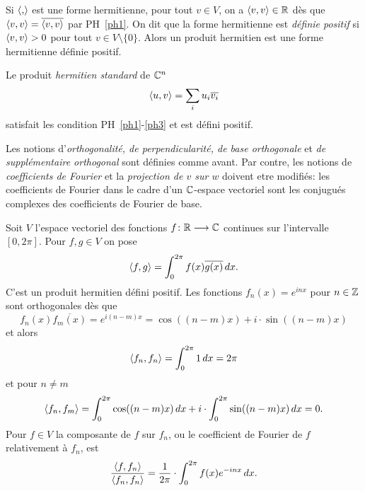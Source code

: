 \begin{remark}
Si $\langle {,} \rangle $  est une forme hermitienne, 
pour tout $v \in V$, on a $\langle {v,v} \rangle \in \mathbb{R}$ dès que $\langle {v,v} \rangle = \overline{\langle {v,v} \rangle}$ par PH~\ref{ph1}.  On dit que la forme hermitienne   est \emph{définie positif} si $\langle {v,v} \rangle >0$ pour tout $v \in V \setminus\{0\}$. Alors un produit hermitien est une forme hermitienne définie positif. 
\end{remark}

\begin{example}
  \label{exe:12}
  Le produit \emph{hermitien standard} de $\mathbb{C}^n$ 
  \begin{displaymath}
    \langle {u,v} \rangle = \sum_i u_i \overline{v_i}
  \end{displaymath}
  satisfait les condition PH~\ref{ph1}-\ref{ph3} et est défini positif.  
\end{example}


Les notions d'\emph{orthogonalité, de perpendicularité, de base orthogonale} et \emph{de supplémentaire orthogonal}  sont définies comme avant. Par contre, les notions de \emph{coefficients de Fourier} et la \emph{projection de $v$ sur $w$} doivent etre modifiés: les coefficients de Fourier dans le cadre d'un $\mathbb{C}$-espace vectoriel sont les conjugués complexes des coefficients de Fourier de base.

\begin{example}
  \label{exe:13}
  Soit $V$ l'espace vectoriel des fonctions $f\colon \mathbb{R} \longrightarrow \mathbb{C}$   continues sur l'intervalle $[0, 2\pi]$. Pour $f,g \in V$ on pose
  \begin{displaymath}
    \langle {f,g} \rangle = \int_0^{2\pi} f(x) \overline{g(x)} \, dx.
  \end{displaymath}
C'est un produit hermitien défini positif. Les fonctions $f_n (x)=  e^{inx}$ pour $n \in \mathbb{Z}$ sont orthogonales dès que 
\begin{displaymath}
  f_n(x) \overline{f_m(x)} = e^{i(n-m)x} = \cos((n-m) x) + i \cdot \sin((n-m) x)
\end{displaymath}
et alors 
\begin{displaymath}
  \langle {f_n,f_n} \rangle = \int_0^{2 \pi} 1 \, dx = 2 \pi 
\end{displaymath}
et pour $n \neq m$ 
\begin{displaymath}
  \langle {f_n,f_m} \rangle = \int_0^{2 \pi} \cos( (n-m) x) \, dx  + i \cdot \int_0^{2 \pi} \sin( (n-m) x) \, dx = 0.
\end{displaymath}
Pour $f \in V$ la composante de $f$ sur $f_n$, ou le coefficient de Fourier de $f$ relativement à $f_n$, est 
\begin{displaymath}
  \frac{\langle {f,f_n} \rangle}{\langle {f_n,f_n} \rangle} = \frac{1}{2\pi} \cdot \int_0^{2\pi} f(x) e^{-inx} \, dx. 
\end{displaymath}
\end{example}





